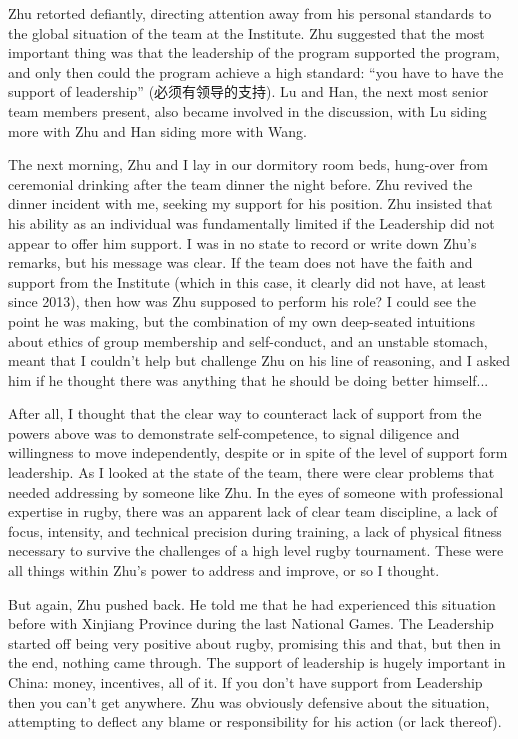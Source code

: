 \begin{CJK}{UTF8}{gbsn}
Zhu retorted defiantly, directing attention away from his personal standards to the global situation of the team at the Institute.  Zhu suggested that the most important thing was that the leadership of the program supported the program, and only then could the program achieve a high standard: ``you have to have the support of leadership'' (必须有领导的支持).  Lu and Han, the next most senior team members present, also became involved in the discussion, with Lu siding more with Zhu and Han siding more with Wang.

The next morning, Zhu and I lay in our dormitory room beds, hung-over from ceremonial drinking after the team dinner the night before.  Zhu revived the dinner incident with me, seeking my support for his position.  Zhu insisted that his ability as an individual was fundamentally limited if the Leadership did not appear to offer him support.  I was in no state to record or write down Zhu's remarks, but his message was clear. If the team does not have the faith and support from the Institute (which in this case, it clearly did not have, at least since 2013), then how was Zhu supposed to perform his role?   I could see the point he was making, but the combination of my own deep-seated intuitions about ethics of group membership and self-conduct, and an unstable stomach, meant that I couldn't help but challenge Zhu on his line of reasoning, and I asked him if he thought there was anything that he should be doing better himself...

After all, I thought that the clear way to counteract lack of support from the powers above was to demonstrate self-competence, to signal diligence and willingness to move independently, despite or in spite of the level of support form leadership.  As I looked at the state of the team, there were clear problems that needed addressing by someone like Zhu.  In the eyes of someone with professional expertise in rugby, there was an apparent lack of clear team discipline, a lack of focus, intensity, and technical precision during training, a lack of physical fitness necessary to survive the challenges of a high level rugby tournament.  These were all things within Zhu's power to address and improve, or so I thought.

But again, Zhu pushed back.  He told me that he had experienced this situation before with Xinjiang Province during the last National Games.  The Leadership started off being very positive about rugby, promising this and that, but then in the end, nothing came through.  The support of leadership is hugely important in China: money, incentives, all of it.  If you don't have support from Leadership then you can't get anywhere.  Zhu was obviously defensive about the situation, attempting to deflect any blame or responsibility for his action (or lack thereof).


\end{CJK}
